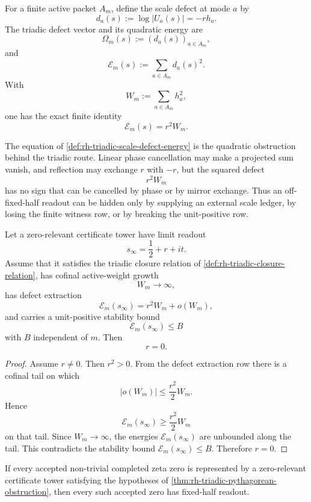 \begin{definition}
\label{def:rh-triadic-scale-defect-energy}
For a finite active packet $A_m$, define the scale defect at mode $a$ by
$$
d_a(s):=\log|U_a(s)|=-r h_a.
$$
The triadic defect vector and its quadratic energy are
$$
\Omega_m(s):=(d_a(s))_{a\in A_m},
$$
and
$$
\mathcal E_m(s)
:=
\sum_{a\in A_m}d_a(s)^2.
$$
With
$$
W_m:=\sum_{a\in A_m}h_a^2,
$$
one has the exact finite identity
$$
\mathcal E_m(s)=r^2W_m.
$$
\end{definition}

\begin{principle}
\label{prin:rh-pythagorean-reading-of-defect}
The equation of \autoref{def:rh-triadic-scale-defect-energy} is the
quadratic obstruction behind the triadic route.  Linear phase
cancellation may make a projected sum vanish, and reflection may exchange
$r$ with $-r$, but the squared defect
$$
r^2W_m
$$
has no sign that can be cancelled by phase or by mirror exchange.  Thus
an off-fixed-half readout can be hidden only by supplying an external
scale ledger, by losing the finite witness row, or by breaking the
unit-positive row.
\end{principle}

\begin{theorem}
\label{thm:rh-triadic-pythagorean-obstruction}
Let a zero-relevant certificate tower have limit readout
$$
s_{\infty}=\frac12+r+it.
$$
Assume that it satisfies the triadic closure relation of
\autoref{def:rh-triadic-closure-relation}, has cofinal active-weight
growth
$$
W_m\to\infty,
$$
has defect extraction
$$
\mathcal E_m(s_{\infty})=r^2W_m+o(W_m),
$$
and carries a unit-positive stability bound
$$
\mathcal E_m(s_{\infty})\le B
$$
with $B$ independent of $m$.  Then
$$
r=0.
$$
\end{theorem}

\begin{proof}
Assume $r\ne0$.  Then $r^2>0$.  From the defect extraction row there is
a cofinal tail on which
$$
|o(W_m)|\le\frac{r^2}{2}W_m.
$$
Hence
$$
\mathcal E_m(s_{\infty})
\ge
\frac{r^2}{2}W_m
$$
on that tail.  Since $W_m\to\infty$, the energies
$\mathcal E_m(s_{\infty})$ are unbounded along the tail.  This
contradicts the stability bound $\mathcal E_m(s_{\infty})\le B$.
Therefore $r=0$.
\end{proof}

\begin{corollary}
\label{cor:rh-triadic-obstruction-fixed-half-readout}
If every accepted non-trivial completed zeta zero is represented by a
zero-relevant certificate tower satisfying the hypotheses of
\autoref{thm:rh-triadic-pythagorean-obstruction}, then every such
accepted zero has fixed-half readout.
\end{corollary}

